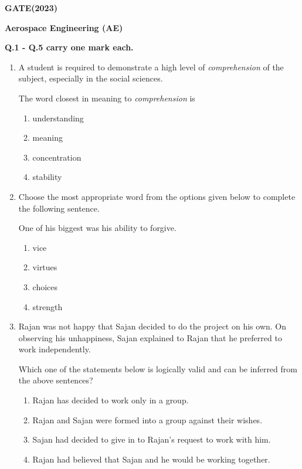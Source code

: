 \documentclass[journal]{IEEEtran}
\begin{document}

\begin{center}
    \textbf{\Large GATE(2023)}
    
    \textbf{Aerospace Engineering (AE)}
    \end{center}

\textbf{\Large Q.1 - Q.5 carry one mark each.}

\begin{enumerate}
\item A student is required to demonstrate a high level of \textit{comprehension} of the subject, especially in the social sciences.

The word closest in meaning to \textit{comprehension} is

\begin{enumerate}
    \item understanding
    \item meaning
    \item concentration
    \item stability
\end{enumerate}
\hfill{}


\item  Choose the most appropriate word from the options given below to complete the following sentence.

One of his biggest \underline{\hspace{1cm}} was his ability to forgive.

\begin{enumerate}
    \item vice
    \item virtues
    \item choices
    \item strength
\end{enumerate}
\hfill{}


\item Rajan was not happy that Sajan decided to do the project on his own. On observing his unhappiness, Sajan explained to Rajan that he preferred to work independently.


Which one of the statements below is logically valid and can be inferred from the above sentences?

\begin{enumerate}
    \item Rajan has decided to work only in a group.
    \item Rajan and Sajan were formed into a group against their wishes.
    \item Sajan had decided to give in to Rajan's request to work with him.
    \item Rajan had believed that Sajan and he would be working together.
\end{enumerate}
\hfill{}


\end{enumerate}
\end{document}
